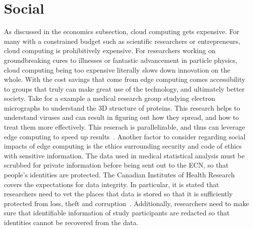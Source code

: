 \documentclass[../mthe-493-final-project.tex]{subfiles}
\begin{document}
    \section{Social}
    \label{sec:social}
    As discussed in the economics subsection, cloud computing gets expensive. For many with a constrained budget such as scientific researchers or entrepreneurs, cloud computing is prohibitively expensive. For researchers working on groundbreaking cures to illnesses or fantastic advancement in particle physics, cloud computing being too expensive literally slows down innovation on the whole. With the cost savings that come from edge computing comes accessibility to groups that truly can make great use of the technology, and ultimately better society. Take for a example a medical research group studying electron micrographs to understand the 3D structure of proteins. This research helps to understand viruses and can result in figuring out how they spread, and how to treat them more effectively. This reserach is parallelizable, and thus can leverage edge computing to speed up results~\cite{parallel-computing-biomedical-research}. Another factor to consider regarding social impacts of edge computing is the ethics surrounding security and code of ethics with sensitive information. The data used in medical statistical analysis must be scrubbed for private information before being sent out to the ECN, so that people's identities are protected. The Canadian Institutes of Health Research covers the expectations for data integrity. In particular, it is stated that researchers need to vet the places that data is stored so that it is sufficiently protected from loss, theft and corruption~\cite{privacy-health-research-best-practices}. Additionally, researchers need to make sure that identifiable information of study participants are redacted so that identities cannot be recovered from the data.
    
\end{document}
